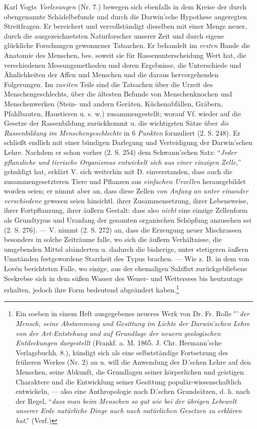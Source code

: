 \documentclass[a4paper, 11pt, oneside, english]{article}
\begin{document}
Karl Vogts \emph{Vorlesungen} (Nr. 7.) bewegen sich ebenfalls in dem Kreise der durch obengenannte Schädelbefunde und durch die Darwin'sche Hypothese angeregten Streitfragen. Er bereichert und vervollständigt dieselben mit einer Menge neuer, durch die ausgezeichnetsten Naturforscher unserer Zeit und durch eigene glückliche Forschungen gewonnener Tatsachen. Er behandelt im \emph{ersten} Bande die Anatomie des Menschen, bes. soweit sie für Rassenunterscheidung Wert hat, die verschiedenen Messungsmethoden und deren Ergebnisse, die Unterschiede und Ähnlichkeiten der Affen und Menschen und die daraus hervorgehenden Folgerungen. Im \emph{zweiten} Teile sind die Tatsachen über die Urzeit des Menschengeschlechts, über die ältesten Befunde von Menschenknochen und Menschenwerken (Stein- und andern Geräten, Küchenabfällen, Gräbern, Pfahlbauten, Haustieren u. s. w.) zusammengestellt; worauf Vf. wieder auf die Gesetze der Rassenbildung zurückkommt u. die wichtigsten Sätze über \emph{die Rassenbildung im Menschengeschlechte} in 6 \emph{Punkten} formuliert (2. S. 248). Er schließt endlich mit einer bündigen Darlegung und Verteidigung der Darwin'schen Lehre. Nachdem er schon vorher (2. S. 254) dem Schwann'schen Satz: "`\emph{Jeder pflanzliche und tierische Organismus entwickelt sich aus einer einzigen Zelle},"' gehuldigt hat, erklärt V. sich weiterhin mit D. einverstanden, dass auch die zusammengesetzteren Tiere und Pflanzen aus \emph{einfachen Urzellen} herausgebildet worden seien; er nimmt aber an, dass diese Zellen \emph{von Anfang an unter einander verschiedene} gewesen seien hinsichtl. ihrer Zusammensetzung, ihrer Lebensweise, ihrer Fortpflanzung, ihrer äußern Gestalt: dass also \emph{nicht} eine einzige Zellenform als Grundtypus und Uranfang der gesamten organischen Schöpfung anzusehen sei (2. S. 276). --- V. nimmt (2. S. 272) an, dass die Erzeugung neuer Mischrassen besonders in solche Zeiträume falle, wo sich die äußern Verhältnisse, die umgebenden Mittel abänderten u. dadurch die bisherige, unter stetigeren äußern Umständen festgewordene Starrheit des Typus brachen. --- Wie z. B. in dem von Lovén berichteten Falle, wo einige, aus der ehemaligen Salzflut zurückgebliebene Seekrebse sich in dem süßen Wasser des Wener- und Wettersees bis heutzutage erhalten, jedoch ihre Form bedeutend abgeändert haben.\footnote{Ein soeben in einem Heft ausgegebenes neueres Werk von Dr. Fr. Rolle "`\emph{der Mensch, seine Abstammung und Gesittung im Lichte der Darwin'schen Lehre von der Art-Entstehung und auf Grundlage der neuern geologischen Entdeckungen dargestellt} (Frankf. a. M. 1865. J. Chr. Hermann'sche Verlagsbuchh. 8.), kündigt sich als eine selbstständige Fortsetzung des früheren Werkes (Nr. 2) an u. will die Anwendung der D.'schen Lehre auf den Menschen, seine Abkunft, die Grundlagen seiner körperlichen und geistigen Charaktere und die Entwicklung seiner Gesittung populär-wissenschaftlich entwickeln, --- also eine Anthropologie nach D.'schen Grundsätzen, d. h. nach der Regel, "`\emph{dass man beim Menschen so gut wie bei der übrigen Lebewelt unserer Erde natürliche Dinge auch nach natürlichen Gesetzen zu erklären hat}."' (Verf.)}
\end{document}
